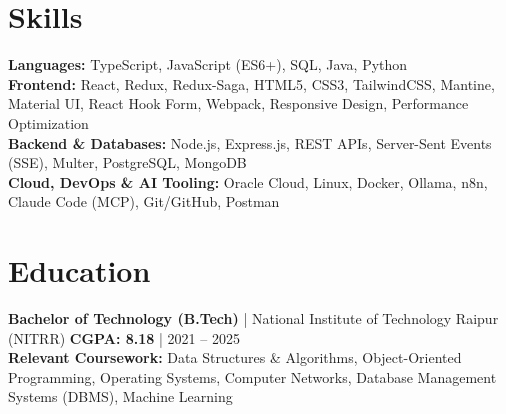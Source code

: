 \documentclass[10pt, a4paper]{article}
\newcommand{\lighttext}[1]{{\fontsize{9.3pt}{11.2pt}\selectfont #1}}
\begin{document}
\section{Skills}
\lighttext{
\textbf{Languages:} TypeScript, JavaScript (ES6+), SQL, Java, Python \\[2pt]
\textbf{Frontend:} React, Redux, Redux-Saga, HTML5, CSS3, TailwindCSS, Mantine, Material UI, React Hook Form, Webpack, Responsive Design, Performance Optimization \\[2pt]
\textbf{Backend \& Databases:} Node.js, Express.js, REST APIs, Server-Sent Events (SSE), Multer, PostgreSQL, MongoDB \\[2pt]
\textbf{Cloud, DevOps \& AI Tooling:} Oracle Cloud, Linux, Docker, Ollama, n8n, Claude Code (MCP), Git/GitHub, Postman
}

\section{Education}
\vspace{0.04cm}
\lighttext{\textbf{Bachelor of Technology (B.Tech)} | National Institute of Technology Raipur (NITRR) \hfill \textbf{CGPA: 8.18} | 2021 -- 2025} \\[2pt]
\lighttext{\textbf{Relevant Coursework:} Data Structures \& Algorithms, Object-Oriented Programming, Operating Systems, Computer Networks, Database Management Systems (DBMS), Machine Learning}
\end{document}
